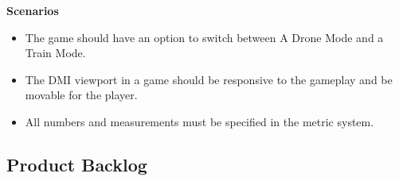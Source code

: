 \textbf{Scenarios} 
\begin{itemize}
    \item The game should have an option to switch between A Drone Mode and a Train Mode. 
    \item The DMI viewport in a game should be responsive to the gameplay and be movable for the player.
    \item All numbers and measurements must be specified in the metric system.
\end{itemize}



\subsection{Product Backlog}

